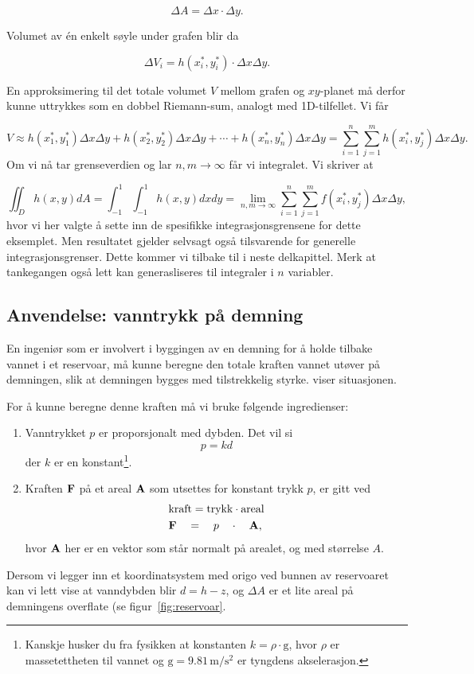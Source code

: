 \[\Delta A=\Delta x\cdot\Delta y.\]

Volumet av én enkelt søyle under grafen blir da

\[\Delta V_i= h(x_i^*,y_i^*)\cdot \Delta x\Delta y.\]

En approksimering til det totale volumet $V$ mellom grafen og $xy$-planet må derfor kunne uttrykkes som en dobbel Riemann-sum, analogt med 1D-tilfellet. Vi får

\[V\approx h(x_1^*,y_1^*) \Delta x \Delta y + h(x_2^*,y_2^*) \Delta x \Delta y + \cdots + h(x_n^*,y_n^*) \Delta x\Delta y = \sum_{i=1}^n\sum_{j=1}^m h(x_i^*,y_j^*)\Delta x\Delta y.\]
Om vi nå tar grenseverdien og lar $n,m\to \infty$ får vi integralet. Vi skriver at

\[\iint_D h(x,y) dA=\int_{-1}^{1}\int_{-1}^1 h(x,y)dxdy = \lim_{n,m\to \infty}\sum_{i=1}^n\sum_{j=1}^m f(x_i^*,y_j^*)\Delta x\Delta y,\]
hvor vi her valgte å sette inn de spesifikke integrasjonsgrensene for dette eksemplet. Men resultatet gjelder selvsagt også tilsvarende for generelle integrasjonsgrenser. Dette kommer vi tilbake til i neste delkapittel. Merk at tankegangen også lett kan generasliseres til integraler i $n$ variabler.

\subsection*{Anvendelse: vanntrykk på demning}
En ingeniør som er involvert i byggingen av en demning for å holde tilbake vannet i et reservoar, må kunne beregne den totale kraften vannet utøver på demningen, slik at demningen bygges med tilstrekkelig styrke.
 viser situasjonen.

For å kunne beregne denne kraften må vi bruke følgende ingredienser:
\begin{enumerate}
  \item Vanntrykket \( p \) er proporsjonalt med dybden. Det vil si
  \begin{equation}
    p = kd \label{eq:pressure}
  \end{equation}
  der \( k \) er en konstant\footnote{Kanskje husker du fra fysikken at konstanten $k=\rho\cdot\textrm{g}$, hvor $\rho$ er massetettheten til vannet og $\textrm{g}=9.81\,\textrm{m}/\textrm{s}^2$ er tyngdens akselerasjon.}.
  \item Kraften $\mathbf{F}$ på et areal $\mathbf{A}$ som utsettes for konstant trykk $p$, er gitt ved
  \begin{align}
&\text{kraft} =\text{trykk} \cdot \text{areal}\nonumber\\
&\mathbf{F}\quad=\quad p\quad\cdot\quad\mathbf{A},
\label{eq:kraftformel}
  \end{align}
  hvor $\mathbf{A}$ her er en vektor som står normalt på arealet, og med størrelse $A$.
\end{enumerate}
Dersom vi legger inn et koordinatsystem med origo ved bunnen av reservoaret kan vi lett vise at vanndybden blir \( d=h-z \), og \( \Delta A \) er et lite areal på demningens overflate (se figur~\ref{fig:reservoar}.


